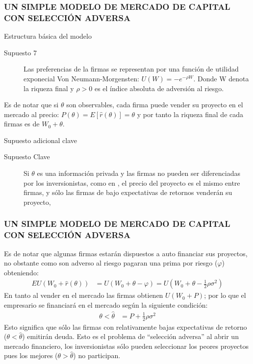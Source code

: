 \begin{frame}
    \frametitle{{\normalsize UN SIMPLE MODELO DE MERCADO DE CAPITAL CON SELECCIÓN ADVERSA} {}}
    
    \begin{block} {Estructura básica del modelo}
        \begin{description}
           \item[Supuesto 7]  Las preferencias de la firmas se representan por una función de utilidad exponecial Von Neumann-Morgensten: $U(W)=-e^{-\rho W}  $. Donde W denota la riqueza final y $\rho>0$ es el índice absoluta de adversión al riesgo.
        \end{description}   
    \end{block}	
    Es de notar que si $\theta $ son observables, cada firma puede vender su proyecto en el mercado al precio: $P(\theta)=E[\hat{r}(\theta)]=\theta $ y por tanto la riqueza final de cada firmas es de $W_{0}+\theta$.\\
    \begin{block} {Supuesto adicional clave}
        \begin{description}
            \item[Supuesto Clave] Si $\theta$ es una información privada y las firmas no pueden ser diferenciadas por los inversionistas, como en \cite{Akerlof1970}, el precio del proyecto es el mismo entre firmas, y sólo las firmas de bajo expectativas de retornos venderán su proyecto,\\  
        \end{description}   
    \end{block}	
    
\end{frame}


\begin{frame}
    \frametitle{{\normalsize UN SIMPLE MODELO DE MERCADO DE CAPITAL CON SELECCIÓN ADVERSA} {}}
  Es de notar que algunas firmas estarán dispuestos a auto financiar sus proyectos, no obstante como son adverso al riesgo pagaran una prima por riesgo ($\varphi$) obteniendo:
    \begin{align}
    EU(W_{0}+\hat{r}(\theta))&=U(W_{0}+\theta-\varphi)=U(W_{0}+\theta-\frac{1}{2}\rho\sigma^{2})\nonumber
    \end{align}
  En tanto al vender en el mercado las firmas obtienen $ U(W_{0}+P)$; por lo que el empresario se financiará en el mercado según la siguiente condición:
    \begin{align}
  \theta<\hat{\theta}&=P+\frac{1}{2}\rho\sigma^{2}
  \end{align}
  Esto significa que sólo las firmas con relativamente bajas expectativas de retorno ($\theta<\hat{\theta}$) emitirán deuda. Esto es el problema de ``selección adversa'' al abrir un mercado financiero, los inversionistas sólo pueden seleccionar los peores proyectos pues los mejores ($\theta>\hat{\theta}$)  no participan.
\end{frame}


